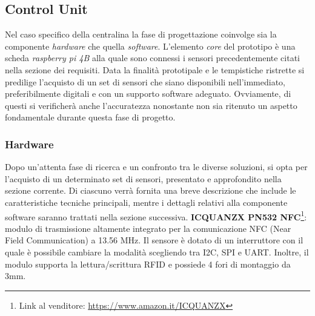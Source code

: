 \subsection{Control Unit}
Nel caso specifico della centralina la fase di progettazione coinvolge sia la componente \textit{hardware} che quella \textit{software}. L'elemento \textit{core} del prototipo è una scheda \textit{raspberry pi 4B} alla quale sono connessi i sensori precedentemente citati nella sezione dei requisiti. Data la finalità prototipale e le tempistiche ristrette si predilige l'acquisto di un set di sensori che siano disponibili nell'immediato, preferibilmente digitali e con un supporto software adeguato. Ovviamente, di questi si verificherà anche l'accuratezza nonostante non sia ritenuto un aspetto fondamentale durante questa fase di progetto. 

\subsubsection{Hardware}
Dopo un'attenta fase di ricerca e un confronto tra le diverse soluzioni, si opta per l'acquisto di un determinato set di sensori, presentato e approfondito nella sezione corrente. Di ciascuno verrà fornita una breve descrizione che include le caratteristiche tecniche principali, mentre i dettagli relativi alla componente software saranno trattati nella sezione successiva.\newline\newline
%
\textbf{ICQUANZX PN532 NFC}\footnote{Link al venditore: \href{https://www.amazon.it/ICQUANZX-Communication-Arduino-Raspberry-Android/dp/B07VT431QZ/}{https://www.amazon.it/ICQUANZX}}: modulo di trasmissione altamente integrato per la comunicazione NFC (Near Field Communication) a 13.56 MHz. Il sensore è dotato di un interruttore con il quale è possibile cambiare la modalità scegliendo tra I2C, SPI e UART. Inoltre, il modulo supporta la lettura/scrittura RFID e possiede 4 fori di montaggio da 3mm. 
    
